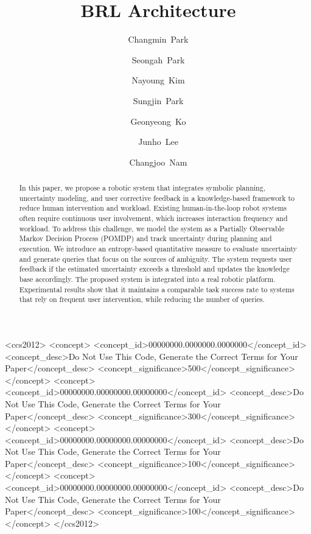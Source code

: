 \documentclass[manuscript,screen,review]{acmart}
\begin{document}
\title{BRL Architecture}

\author{Changmin~Park}
\author{Seongah~Park}
\authornotemark[1]

\author{Nayoung~Kim}

\author{Sungjin~Park}

\author{Geonyeong~Ko}

\author{Junho~Lee}

\author{Changjoo~Nam}

\begin{abstract}
In this paper, we propose a robotic system that integrates symbolic planning, uncertainty modeling, and user corrective feedback in a knowledge-based framework to reduce human intervention and workload. Existing human-in-the-loop robot systems often require continuous user involvement, which increases interaction frequency and workload. To address this challenge, we model the system as a Partially Observable Markov Decision Process (POMDP) and track uncertainty during planning and execution. We introduce an entropy-based quantitative measure to evaluate uncertainty and generate queries that focus on the sources of ambiguity. The system requests user feedback if the estimated uncertainty exceeds a threshold and updates the knowledge base accordingly. The proposed system is integrated into a real robotic platform. Experimental results show that it maintains a comparable task success rate to systems that rely on frequent user intervention, while reducing the number of queries.
\end{abstract}


\begin{CCSXML}
<ccs2012>
 <concept>
  <concept_id>00000000.0000000.0000000</concept_id>
  <concept_desc>Do Not Use This Code, Generate the Correct Terms for Your Paper</concept_desc>
  <concept_significance>500</concept_significance>
 </concept>
 <concept>
  <concept_id>00000000.00000000.00000000</concept_id>
  <concept_desc>Do Not Use This Code, Generate the Correct Terms for Your Paper</concept_desc>
  <concept_significance>300</concept_significance>
 </concept>
 <concept>
  <concept_id>00000000.00000000.00000000</concept_id>
  <concept_desc>Do Not Use This Code, Generate the Correct Terms for Your Paper</concept_desc>
  <concept_significance>100</concept_significance>
 </concept>
 <concept>
  <concept_id>00000000.00000000.00000000</concept_id>
  <concept_desc>Do Not Use This Code, Generate the Correct Terms for Your Paper</concept_desc>
  <concept_significance>100</concept_significance>
 </concept>
</ccs2012>
\end{CCSXML}
\end{document}
